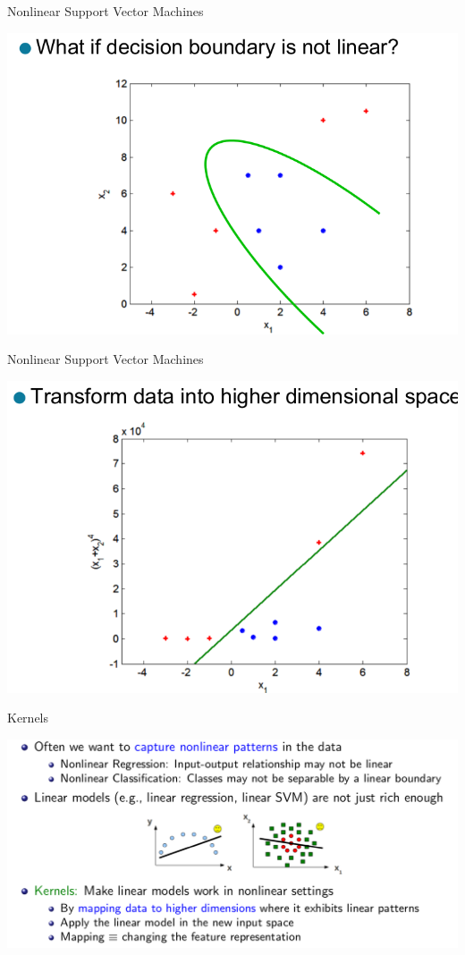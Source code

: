 \documentclass{beamer}
\begin{document}
\begin{frame}{Nonlinear Support Vector Machines}
    \begin{center}
        \includegraphics[scale=0.32]{svm11.png}
    \end{center}
\end{frame}
\begin{frame}{Nonlinear Support Vector Machines}
    \begin{center}
        \includegraphics[scale=0.32]{svm12.png}
    \end{center}
\end{frame}
\begin{frame}{Kernels}
    \begin{center}
        \includegraphics[scale=0.32]{kernels1.png}
    \end{center}
\end{frame}
\end{document}
